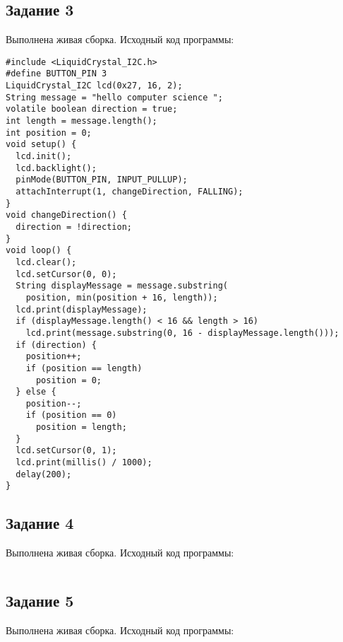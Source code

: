 \documentclass[a4paper,14pt]{extarticle}
\begin{document}
  \subsection*{\hspace{12.5mm}Задание 3}
  Выполнена живая сборка. Исходный код программы:

  \begingroup
    \fontsize{14pt}{10pt}\selectfont
    \linespread{1}
    \begin{verbatim}
#include <LiquidCrystal_I2C.h>
#define BUTTON_PIN 3
LiquidCrystal_I2C lcd(0x27, 16, 2);
String message = "hello computer science ";
volatile boolean direction = true;
int length = message.length();
int position = 0;
void setup() {
  lcd.init();
  lcd.backlight();
  pinMode(BUTTON_PIN, INPUT_PULLUP);
  attachInterrupt(1, changeDirection, FALLING);
}
void changeDirection() {
  direction = !direction;
}
void loop() {
  lcd.clear();
  lcd.setCursor(0, 0);
  String displayMessage = message.substring(
    position, min(position + 16, length));
  lcd.print(displayMessage);
  if (displayMessage.length() < 16 && length > 16)
    lcd.print(message.substring(0, 16 - displayMessage.length()));
  if (direction) {
    position++;
    if (position == length)
      position = 0;
  } else {
    position--;
    if (position == 0)
      position = length;
  }
  lcd.setCursor(0, 1);
  lcd.print(millis() / 1000);
  delay(200);
}
    \end{verbatim}
  \endgroup

  \subsection*{\hspace{12.5mm}Задание 4}
  Выполнена живая сборка. Исходный код программы:

  \begingroup
    \fontsize{14pt}{10pt}\selectfont
    \linespread{1}
    \begin{verbatim}
    \end{verbatim}
  \endgroup

  \subsection*{\hspace{12.5mm}Задание 5}
  Выполнена живая сборка. Исходный код программы:
\end{document}
